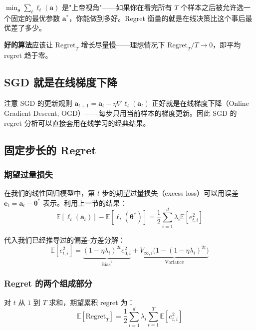 \documentclass[12pt, a4paper]{ctexart}
\begin{document}
$\min_{\mathbf{a}} \sum_t \ell_t(\mathbf{a})$ 是"上帝视角"——如果你在看完所有 $T$ 个样本之后被允许选一个固定的最优参数 $\mathbf{a}^*$，你能做到多好。Regret 衡量的就是在线决策比这个事后最优差了多少。

\textbf{好的算法}应该让 $\mathrm{Regret}_T$ 增长尽量慢——理想情况下 $\mathrm{Regret}_T / T \to 0$，即平均 regret 趋于零。

\subsection{SGD 就是在线梯度下降}

注意 SGD 的更新规则 $\mathbf{a}_{t+1} = \mathbf{a}_t - \eta \nabla \ell_t(\mathbf{a}_t)$ 正好就是在线梯度下降（Online Gradient Descent, OGD）——每步只用当前样本的梯度更新。因此 SGD 的 regret 分析可以直接套用在线学习的经典结果。

\subsection{固定步长的 Regret}

\subsubsection{期望过量损失}

在我们的线性回归模型中，第 $t$ 步的期望过量损失（excess loss）可以用误差 $\mathbf{e}_t = \mathbf{a}_t - \boldsymbol{\theta}^*$ 表示。利用上一节的结果：
\begin{equation}
    \mathbb{E}[\ell_t(\mathbf{a}_t)] - \mathbb{E}[\ell_t(\boldsymbol{\theta}^*)] = \frac{1}{2}\sum_{i=1}^d \lambda_i \mathbb{E}[e_{t,i}^2]
\end{equation}

代入我们已经推导过的偏差-方差分解：
\begin{equation}
    \mathbb{E}[e_{t,i}^2] = \underbrace{(1-\eta\lambda_i)^{2t} e_{0,i}^2}_{\text{Bias}^2} + \underbrace{V_{\infty,i}\bigl(1 - (1-\eta\lambda_i)^{2t}\bigr)}_{\text{Variance}}
\end{equation}

\subsubsection{Regret 的两个组成部分}

对 $t$ 从 $1$ 到 $T$ 求和，期望累积 regret 为：
\begin{equation}
    \mathbb{E}[\mathrm{Regret}_T] = \frac{1}{2}\sum_{i=1}^d \lambda_i \sum_{t=1}^T \mathbb{E}[e_{t,i}^2]
\end{equation}
\end{document}
